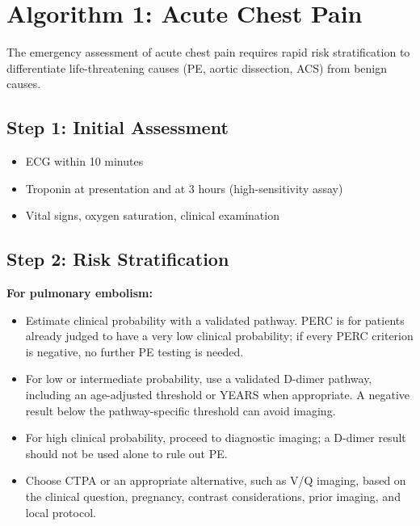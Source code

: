 \clearpage

\section{Algorithm 1: Acute Chest Pain}

The emergency assessment of acute chest pain requires rapid risk stratification to differentiate life-threatening causes (PE, aortic dissection, ACS) from benign causes.

\subsection{Step 1: Initial Assessment}
\begin{itemize}
    \item ECG within 10 minutes
    \item Troponin at presentation and at 3 hours (high-sensitivity assay)
    \item Vital signs, oxygen saturation, clinical examination
\end{itemize}

\subsection{Step 2: Risk Stratification}

\textbf{For pulmonary embolism:}
\begin{itemize}
    \item Estimate clinical probability with a validated pathway. PERC is for patients already judged to have a very low clinical probability; if every PERC criterion is negative, no further PE testing is needed.
    \item For low or intermediate probability, use a validated D-dimer pathway, including an age-adjusted threshold or YEARS when appropriate. A negative result below the pathway-specific threshold can avoid imaging.
    \item For high clinical probability, proceed to diagnostic imaging; a D-dimer result should not be used alone to rule out PE.
    \item Choose CTPA or an appropriate alternative, such as V/Q imaging, based on the clinical question, pregnancy, contrast considerations, prior imaging, and local protocol.
\end{itemize}

